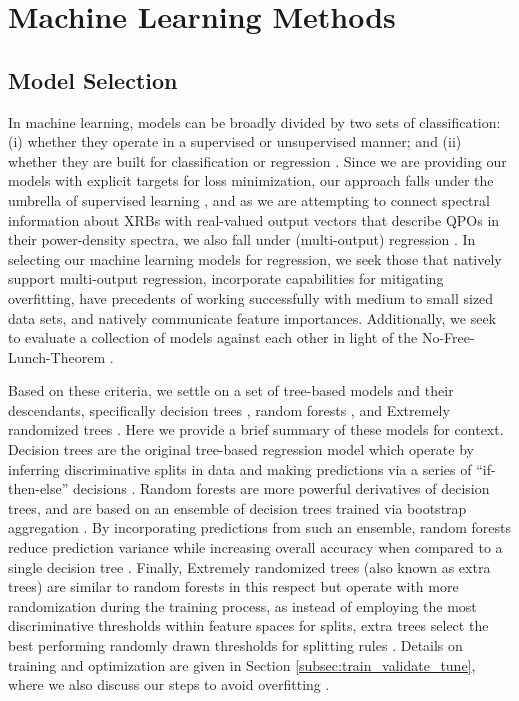 \documentclass[fleqn,usenatbib,twocolumn]{mnras}%
\begin{document}
\section{Machine Learning Methods}\label{sec:methods}

\subsection{Model Selection}

In machine learning, models can be broadly divided by two sets of classification: (i) whether they operate in a supervised or unsupervised manner; and (ii) whether they are built for classification or regression \citep{bruce2017practical}. Since we are providing our models with explicit targets for loss minimization, our approach falls under the umbrella of supervised learning \citep{supervisedreview}, and as we are attempting to connect spectral information about XRBs with real-valued output vectors that describe QPOs in their power-density spectra, we also fall under (multi-output) regression \citep{multioutputreview}. In selecting our machine learning models for regression, we seek those that natively support multi-output regression, incorporate capabilities for mitigating overfitting, have precedents of working successfully with medium to small sized data sets, and natively communicate feature importances. Additionally, we seek to evaluate a collection of models against each other in light of the No-Free-Lunch-Theorem \citep{NoFreeLunch,avoidMLpitfalls}.  
    
Based on these criteria, we settle on a set of tree-based models and their descendants, specifically decision trees \citep{breiman1984original}, random forests \citep{breiman2001random}, and Extremely randomized trees \citep{extratrees}. Here we provide a brief summary of these models for context. Decision trees are the original tree-based regression model which operate by inferring discriminative splits in data and making predictions via a series of ``if-then-else'' decisions \citep{breiman1984original}. Random forests are more powerful derivatives of decision trees, and are based on an ensemble of decision trees trained via bootstrap aggregation \citep{breiman1996bagging,breiman2001random}. By incorporating predictions from such an ensemble, random forests reduce prediction variance while increasing overall accuracy when compared to a single decision tree \citep{lakshminarayanan2016decision}. Finally, Extremely randomized trees (also known as extra trees) are similar to random forests in this respect but operate with more randomization during the training process, as instead of employing the most discriminative thresholds within feature spaces for splits, extra trees select the best performing randomly drawn thresholds for splitting rules \citep{extratrees,scikit-learn}. Details on training and optimization are given in Section \ref{subsec:train_validate_tune}, where we also discuss our steps to avoid overfitting \citep{bruce2017practical}.
\end{document}
